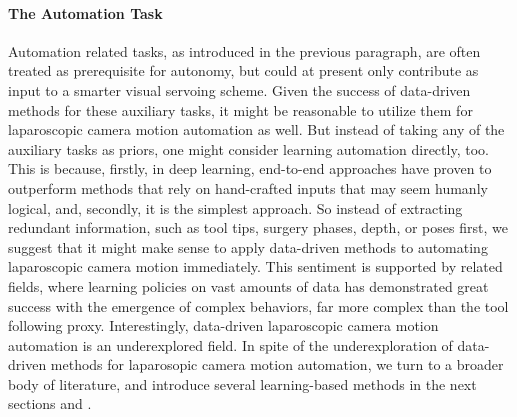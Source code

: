 \paragraph{The Automation Task} Automation related tasks, as introduced in the previous paragraph, are often treated as prerequisite for autonomy, but could at present only contribute as input to a smarter visual servoing scheme. Given the success of data-driven methods for these auxiliary tasks, it might be reasonable to utilize them for laparoscopic camera motion automation as well. But instead of taking any of the auxiliary tasks as priors, one might consider learning automation directly, too. This is because, firstly, in deep learning, end-to-end approaches have proven to outperform methods that rely on hand-crafted inputs that may seem humanly logical, and, secondly, it is the simplest approach. So instead of extracting redundant information, such as tool tips, surgery phases, depth, or poses first, we suggest that it might make sense to apply data-driven methods to automating laparoscopic camera motion immediately. This sentiment is supported by related fields, where learning policies on vast amounts of data has demonstrated great success with the emergence of complex behaviors, far more complex than the tool following proxy. Interestingly, data-driven laparoscopic camera motion automation is an underexplored field. In spite of the underexploration of data-driven methods for laparosopic camera motion automation, we turn to a broader body of literature, and introduce several learning-based methods in the next sections  and .






